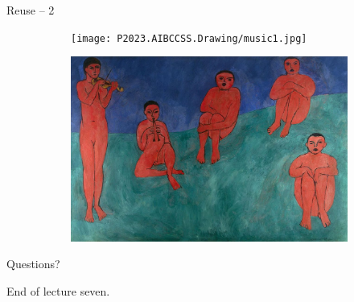 \documentclass{beamer}
\begin{document}
\begin{frame}
{\centerline{Reuse -- 2}}

\begin{figure}
\centering
\begin{subfigure}{.5\textwidth}
  \centering
  \texttt{[image: P2023.AIBCCSS.Drawing/music1.jpg]}
\end{subfigure}%
\begin{subfigure}{.5\textwidth}
  \centering
  \includegraphics[width=0.95\linewidth]{P2023.AIBCCSS.Drawing/music.jpg}
\end{subfigure}
\end{figure}

\end{frame}



\begin{frame}
{\centerline{Questions?}}
\vspace{1cm}
\begin{center}
    \LARGE{End of lecture seven.}
\end{center}

\end{frame}
\end{document}
